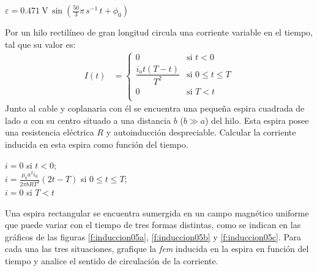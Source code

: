 \begin{Answer}
    \begin{minipage}[t]{.4\textwidth}
        $\varepsilon = \SI{0.471}{\volt}\,\sin(\frac{50}{3}\pi\,\si{s^{-1}}\,t+\phi_0)$
    \end{minipage}
\end{Answer}
%
\begin{center}
\end{center}
%
\begin{Exercise}
    Por un hilo rectilíneo de gran longitud circula una corriente variable en el tiempo, tal que su valor es:
    \begin{align*}
        I(t) &=
        \begin{cases}
            0 & \text{si } t < 0\\
            \dfrac{i_ot(T-t)}{T^2} & \text{si } 0 \leq t \leq T\\
            0 & \text{si } T < t\\
        \end{cases}
    \end{align*}
    Junto al cable y coplanaria con él se encuentra una pequeña espira cuadrada de lado $a$ con su centro situado a una distancia $b$ ($b \gg a$) del hilo. Esta espira posee una resistencia eléctrica $R$ y autoinducción despreciable. Calcular la corriente inducida en esta espira como función del tiempo.
\end{Exercise}
\begin{Answer}
    \begin{minipage}[t]{.4\textwidth}
        $i = 0$ si $t<0$;\\ $i = \frac{\mu_0a^2i_0}{2\pi b R T^2}(2t-T)$ si $0 \leq t \leq T$;\\ $i=0$ si $T<t$
    \end{minipage}
\end{Answer}
%
\begin{Exercise}\label{p:induccion05}
    Una espira rectangular se encuentra sumergida en un campo magnético uniforme que puede variar con el tiempo de tres formas distintas, como se indican en las gráficos de las figuras \ref{f:induccion05a}, \ref{f:induccion05b} y \ref{f:induccion05c}. Para cada una las tres situaciones, grafique la \textit{fem} inducida en la espira en función del tiempo y analice el sentido de circulación de la corriente.
\end{Exercise}
